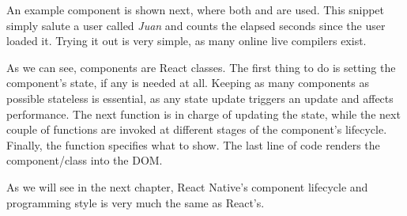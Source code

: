 An example component is shown next, where both  and  are used. This snippet simply salute a user called \textit{Juan} and counts the elapsed seconds since the user loaded it. Trying it out is very simple, as many online live compilers exist.

\lstset{style=myhtml}


As we can see, components are React classes. The first thing to do is setting the component's state, if any is needed at all. Keeping as many components as possible stateless is essential, as any state update triggers an update and affects performance. The next function is in charge of updating the state, while the next couple of functions are invoked at different stages of the component's lifecycle. Finally, the  function specifies what to show. The last line of code renders the component/class into the DOM.

As we will see in the next chapter, React Native's component lifecycle and programming style is very much the same as React's.